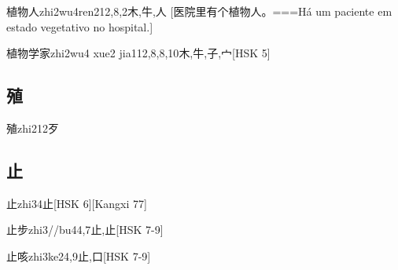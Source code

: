 \begin{EntryWithPhonetic}{植物人}{zhi2wu4ren2}{12,8,2}{⽊,⽜,⼈}
  [医院里有个植物人。===Há um paciente em estado vegetativo no hospital.]
\end{EntryWithPhonetic}

\begin{EntryWithPhonetic}{植物学家}{zhi2wu4 xue2 jia1}{12,8,8,10}{⽊,⽜,⼦,⼧}[HSK 5]
\end{EntryWithPhonetic}

\subsection*{殖}

\begin{EntryWithPhonetic}{殖}{zhi2}{12}{⽍}
\end{EntryWithPhonetic}

\subsection*{止}

\begin{EntryWithPhonetic}{止}{zhi3}{4}{⽌}[HSK 6][Kangxi 77]
\end{EntryWithPhonetic}

\begin{EntryWithPhonetic}{止步}{zhi3//bu4}{4,7}{⽌,⽌}[HSK 7-9]
\end{EntryWithPhonetic}

\begin{EntryWithPhonetic}{止咳}{zhi3ke2}{4,9}{⽌,⼝}[HSK 7-9]
\end{EntryWithPhonetic}

